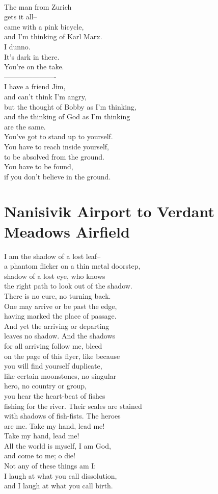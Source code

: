 \documentclass[smalldemyvopaper,11pt,twoside,onecolumn,openright,extrafontsizes]{memoir}
\begin{document}
\\The man from Zurich
\\gets it all--
\\came with a pink bicycle,
\\and I'm thinking of Karl Marx.
\\I dunno.
\\It's dark in there.
\\You're on the take.
\\———————-
\\I have a friend Jim,
\\and can't think I'm angry,
\\but the thought of Bobby as I'm thinking,
\\and the thinking of God as I'm thinking
\\are the same.
\\You've got to stand up to yourself.
\\You have to reach inside yourself,
\\to be absolved from the ground.
\\You have to be found,
\\if you don't believe in the ground.



\chapter{Nanisivik Airport to Verdant Meadows Airfield}
I am the shadow of a lost leaf--
\\a phantom flicker on a thin metal doorstep,
\\shadow of a lost eye, who knows
\\the right path to look out of the shadow.
\\There is no cure, no turning back.
\\One may arrive or be past the edge,
\\having marked the place of passage.
\\And yet the arriving or departing
\\leaves no shadow. And the shadows
\\for all arriving follow me, bleed
\\on the page of this flyer, like because
\\you will find yourself duplicate,
\\like certain moonstones, no singular
\\hero, no country or group,
\\you hear the heart-beat of fishes
\\fishing for the river. Their scales are stained
\\with shadows of fish-fists. The heroes
\\are me. Take my hand, lead me!
\\Take my hand, lead me!
\\All the world is myself, I am God,
\\and come to me; o die!
\\Not any of these things am I:
\\I laugh at what you call dissolution,
\\and I laugh at what you call birth.
\end{document}
